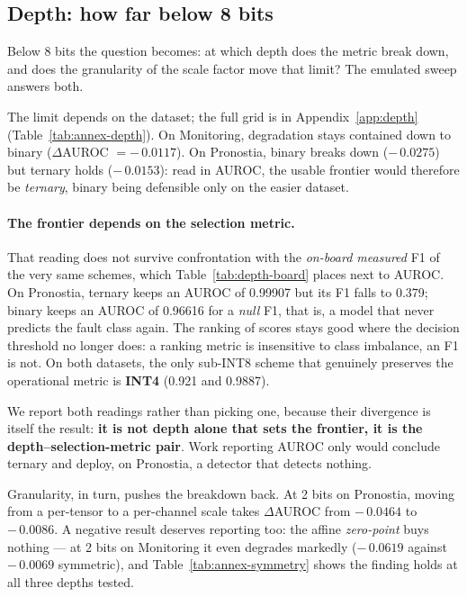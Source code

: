 \subsection{Depth: how far below 8 bits}

Below 8 bits the question becomes: at which depth does the metric break down, and does the granularity of
the scale factor move that limit? The emulated sweep answers both.

The limit depends on the dataset; the full grid is in Appendix~\ref{app:depth}
(Table~\ref{tab:annex-depth}). On Monitoring, degradation stays contained down to binary
($\Delta$AUROC $=-\,\num{0.0117}$). On Pronostia, binary breaks down ($-\,\num{0.0275}$) but ternary holds
($-\,\num{0.0153}$): read in AUROC, the usable frontier would therefore be \emph{ternary}, binary being
defensible only on the easier dataset.

\paragraph{The frontier depends on the selection metric.} That reading does not survive confrontation with
the \emph{on-board measured} F1 of the very same schemes, which Table~\ref{tab:depth-board} places next to
AUROC. On Pronostia, ternary keeps an AUROC of \num{0.99907} but its F1 falls to \num{0.379}; binary keeps
an AUROC of \num{0.96616} for a \emph{null} F1, that is, a model that never predicts the fault class again.
The ranking of scores stays good where the decision threshold no longer does: a ranking metric is
insensitive to class imbalance, an F1 is not. On both datasets, the only sub-INT8 scheme that genuinely
preserves the operational metric is \textbf{INT4} (\num{0.921} and \num{0.9887}).

We report both readings rather than picking one, because their divergence is itself the result:
\textbf{it is not depth alone that sets the frontier, it is the depth--selection-metric pair}. Work
reporting AUROC only would conclude ternary and deploy, on Pronostia, a detector that detects nothing.



Granularity, in turn, pushes the breakdown back. At 2 bits on Pronostia, moving from a per-tensor to a
per-channel scale takes $\Delta$AUROC from $-\,\num{0.0464}$ to $-\,\num{0.0086}$. A negative result
deserves reporting too: the affine \emph{zero-point} buys nothing --- at 2 bits on Monitoring it even
degrades markedly ($-\,\num{0.0619}$ against $-\,\num{0.0069}$ symmetric), and
Table~\ref{tab:annex-symmetry} shows the finding holds at all three depths tested.

